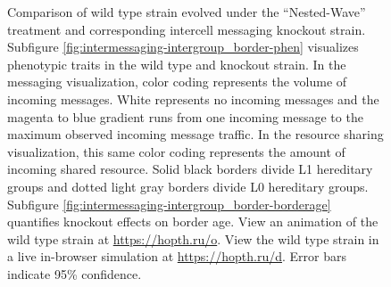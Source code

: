 \begin{figure}[!htbp]
\begin{center}
\caption{
Comparison of wild type strain evolved under the ``Nested-Wave'' treatment and corresponding intercell messaging knockout strain.
Subfigure \ref{fig:intermessaging-intergroup_border-phen} visualizes phenotypic traits in the wild type and knockout strain.
In the messaging visualization, color coding represents the volume of incoming messages.
White represents no incoming messages and the magenta to blue gradient runs from one incoming message to the maximum observed incoming message traffic.
In the resource sharing visualization, this same color coding represents the amount of incoming shared resource.
Solid black borders divide L1 hereditary groups and dotted light gray borders divide L0 hereditary groups.
Subfigure \ref{fig:intermessaging-intergroup_border-borderage} quantifies knockout effects on border age.
View an animation of the wild type strain at \url{https://hopth.ru/o}.
View the wild type strain in a live in-browser simulation at \url{https://hopth.ru/d}.
Error bars indicate 95\% confidence.
}
\label{fig:ko-intermessaging-intergroup_border}

\end{center}
\end{figure}
